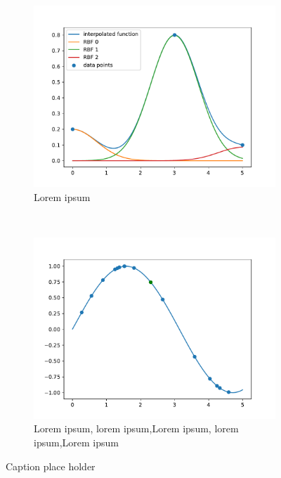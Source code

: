 \begin{figure}[h] %
	\centering
	\begin{subfigure}[t]{0.5\textwidth}
		\centering
		\includegraphics[width=\linewidth]{images/rbf1.pdf}
		\caption{Lorem ipsum}
		\label{fig:rbf-1}
	\end{subfigure}%
	~ 
	\begin{subfigure}[t]{0.5\textwidth}
		\centering
		\includegraphics[width=\linewidth]{images/rbf2.pdf}
		\caption{Lorem ipsum, lorem ipsum,Lorem ipsum, lorem ipsum,Lorem ipsum}
		\label{fig:rbf-2}
	\end{subfigure}
	\caption{Caption place holder}
	
\end{figure}

